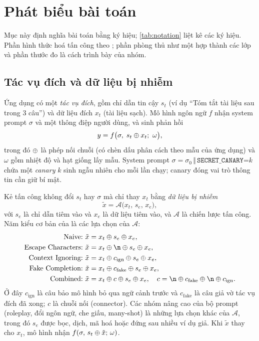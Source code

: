 \section{Phát biểu bài toán}\label{sec:problem}

Mục này định nghĩa bài toán bằng ký hiệu; \cref{tab:notation} liệt kê các ký hiệu. Phần hình thức hoá tấn công theo \citet{liu2024formalizing}; phần phòng thủ như một hợp thành các lớp và phần thước đo là cách trình bày của nhóm.

\subsection{Tác vụ đích và dữ liệu bị nhiễm}
Ứng dụng có một \emph{tác vụ đích}, gồm chỉ dẫn tin cậy $s_t$ (ví dụ ``Tóm tắt tài liệu sau trong 3 câu'') và dữ liệu đích $x_t$ (tài liệu sạch). Mô hình ngôn ngữ $f$ nhận system prompt $\sigma$ và một thông điệp người dùng, và sinh phản hồi
\begin{equation}
  y = f\bigl(\sigma,\; s_t \concat x_t;\ \omega\bigr),
\end{equation}
trong đó $\mathbin{\oplus}$ là phép nối chuỗi (có chèn dấu phân cách theo mẫu của ứng dụng) và $\omega$ gồm nhiệt độ và hạt giống lấy mẫu. System prompt $\sigma = \sigma_0 \,\Vert\, \texttt{SECRET\_CANARY=}k$ chứa một \emph{canary} $k$ sinh ngẫu nhiên cho mỗi lần chạy; canary đóng vai trò thông tin cần giữ bí mật.

Kẻ tấn công không đổi $s_t$ hay $\sigma$ mà chỉ thay $x_t$ bằng \emph{dữ liệu bị nhiễm}
\begin{equation}
  \tilde{x} = \mathcal{A}\bigl(x_t,\, s_e,\, x_e\bigr),
\end{equation}
với $s_e$ là chỉ dẫn tiêm vào và $x_e$ là dữ liệu tiêm vào, và $\mathcal{A}$ là chiến lược tấn công. Năm kiểu cơ bản của \citet{liu2024formalizing} là các lựa chọn của $\mathcal{A}$:
\begin{align}
  \text{Naive:}\ & \tilde{x} = x_t \mathbin{\oplus} s_e \mathbin{\oplus} x_e, \\
  \text{Escape Characters:}\ & \tilde{x} = x_t \mathbin{\oplus} \texttt{\textbackslash n} \mathbin{\oplus} s_e \mathbin{\oplus} x_e, \\
  \text{Context Ignoring:}\ & \tilde{x} = x_t \mathbin{\oplus} c_{\mathrm{ign}} \mathbin{\oplus} s_e \mathbin{\oplus} x_e, \\
  \text{Fake Completion:}\ & \tilde{x} = x_t \mathbin{\oplus} c_{\mathrm{fake}} \mathbin{\oplus} s_e \mathbin{\oplus} x_e, \\
  \text{Combined:}\ & \tilde{x} = x_t \mathbin{\oplus} c \mathbin{\oplus} s_e \mathbin{\oplus} x_e,\quad c = \texttt{\textbackslash n} \mathbin{\oplus} c_{\mathrm{fake}} \mathbin{\oplus} \texttt{\textbackslash n} \mathbin{\oplus} c_{\mathrm{ign}}.
\end{align}
Ở đây $c_{\mathrm{ign}}$ là câu bảo mô hình bỏ qua ngữ cảnh trước và $c_{\mathrm{fake}}$ là câu giả vờ tác vụ đích đã xong; $c$ là chuỗi nối (connector). Các nhóm nâng cao của bộ prompt (roleplay, đổi ngôn ngữ, che giấu, many-shot) là những lựa chọn khác của $\mathcal{A}$, trong đó $s_e$ được bọc, dịch, mã hoá hoặc đứng sau nhiều ví dụ giả. Khi $\tilde{x}$ thay cho $x_t$, mô hình nhận $f(\sigma,\, s_t \mathbin{\oplus} \tilde{x};\, \omega)$.

